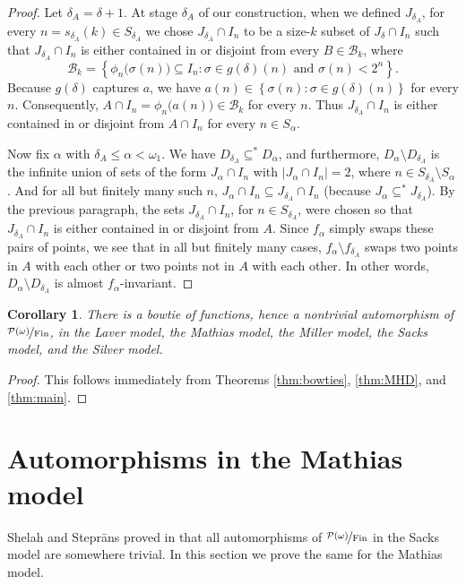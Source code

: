 \documentclass[11pt,leqno]{amsart}
\newtheorem{corollary}[theorem]{Corollary}
\theoremstyle{definition}
\theoremstyle{remark}
\newcommand{\B}{\mathcal{B}}
\newcommand{\explicitSet}[1]{\left\lbrace #1 \right\rbrace}
\newcommand{\set}[2]{\explicitSet{#1 \colon #2}}
\newcommand{\<}{\langle}
\renewcommand{\>}{\rangle}
\renewcommand{\a}{\alpha}
\newcommand{\dlt}{\delta}
\newcommand{\s}{\sigma}
\newcommand{\w}{\omega}
\newcommand{\0}{\emptyset}
\newcommand{\sub}{\subseteq}
\newcommand{\1}{1\hspace{-1.75mm}1}
\newcommand{\pwmf}{\nicefrac{\mathcal{P}(\w)}{\mathrm{Fin}}}
\begin{document}
\begin{proof}
Let $\dlt_A = \dlt+1$. 
At stage $\dlt_A$ of our construction, when we defined $J_{\dlt_A}$, 
for every $n = s_{\dlt_A}(k) \in S_{\dlt_A}$ we chose $J_{\dlt_A} \cap I_n$ to be a size-$k$ subset of $J_{\dlt} \cap I_n$ such that $J_{\dlt_A} \cap I_n$ is either contained in or disjoint from every $B \in \B_k$, where 
$$\B_k = \set{\phi_n\big(\s(n)\big) \sub I_n}{\s \in g(\dlt)(n) \text{ and }\s(n) < 2^n}.$$ 
Because $g(\dlt)$ captures $a$, we have $a(n) \in \set{\s(n)}{\s \in g(\dlt)(n)}$ for every $n$. 
Consequently, $A \cap I_n = \phi_n\big(a(n)\big) \in \B_k$ for every $n$. 
Thus $J_{\dlt_A} \cap I_n$ is either contained in or disjoint from $A \cap I_n$ for every $n \in S_\a$. 

Now fix $\a$ with $\dlt_A \leq \a < \w_1$. 
We have $D_{\dlt_A} \sub^* D_\a$, and furthermore, $D_\a \setminus D_{\dlt_A}$ is the infinite union of sets of the form $J_\a \cap I_n$ with $|J_\a \cap I_n| = 2$, where $n \in S_{\dlt_A} \!\setminus S_\a$. 
And for all but finitely many such $n$, $J_\a \cap I_n \sub J_{\dlt_A} \cap I_n$ (because $J_\a \sub^* J_{\dlt_A}$). By the previous paragraph, the sets $J_{\dlt_A} \cap I_n$, for $n \in S_{\dlt_A}$, were chosen so that $J_{\dlt_A} \cap I_n$ is either contained in or disjoint from $A$. 
Since $f_\a$ simply swaps these pairs of points, we see that in all but finitely many cases, $f_\a \setminus f_{\dlt_A}$ swaps two points in $A$ with each other or two points not in $A$ with each other. In other words, $D_\a \setminus D_{\dlt_A}$ is almost $f_\a$-invariant.
\end{proof}


\begin{corollary}
There is a bowtie of functions, hence a nontrivial automorphism of $\pwmf$, in the Laver model, the Mathias model, the Miller model, the Sacks model, and the Silver model.  
\end{corollary}
\begin{proof}
This follows immediately from Theorems \ref{thm:bowties}, \ref{thm:MHD}, and \ref{thm:main}. 
\end{proof}




\section{Automorphisms in the Mathias model}

Shelah and Stepr\={a}ns proved in \cite{SS2} that all automorphisms of $\pwmf$ in the Sacks model are somewhere trivial. In this section we prove the same for the Mathias model. 
\end{document}

